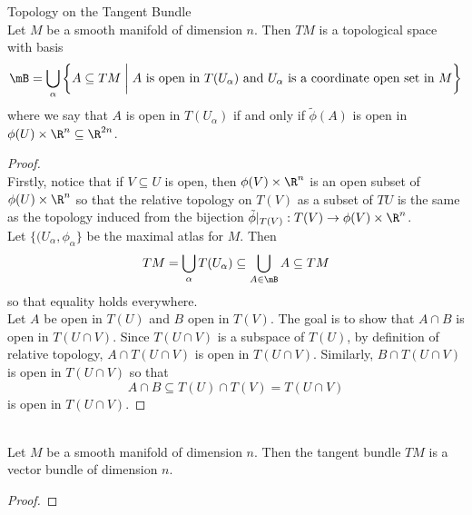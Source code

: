 \documentclass[a4paper]{article}
\begin{document}
\begin{thm}{Topology on the Tangent Bundle}{}\\
Let $M$ be a smooth manifold of dimension $n$. Then $TM$ is a topological space with basis $$\mB=\bigcup_{\alpha}\left\{A\subseteq TM\;\bigg{|}\;A\text{ is open in } T(U_\alpha)\text{ and } U_\alpha\text{ is a coordinate open set in }M\right\}$$ where we say that $A$ is open in $T(U_\alpha)$ if and only if $\tilde{\phi}(A)$ is open in $\phi(U)\times\R^n\subseteq\R^{2n}$. 
\begin{proof}\\
Firstly, notice that if $V\subseteq U$ is open, then $\phi(V)\times\R^n$ is an open subset of $\phi(U)\times\R^n$ so that the relative topology on $T(V)$ as a subset of $TU$ is the same as the topology induced from the bijection $\tilde{\phi}|_{T(V)}:T(V)\to\phi(V)\times\R^n$. \\

Let $\{(U_\alpha,\phi_\alpha\}$ be the maximal atlas for $M$. Then $$TM=\bigcup_{\alpha}T(U_\alpha)\subseteq\bigcup_{A\in\mB}A\subseteq TM$$ so that equality holds everywhere. \\

Let $A$ be open in $T(U)$ and $B$ open in $T(V)$. The goal is to show that $A\cap B$ is open in $T(U\cap V)$. Since $T(U\cap V)$ is a subspace of $T(U)$, by definition of relative topology, $A\cap T(U\cap V)$ is open in $T(U\cap V)$. Similarly, $B\cap T(U\cap V)$ is open in $T(U\cap V)$ so that $$A\cap B\subseteq T(U)\cap T(V)=T(U\cap V)$$ is open in $T(U\cap V)$. 
\end{proof}
\end{thm}

\begin{prp}{}{}\\
Let $M$ be a smooth manifold of dimension $n$. Then the tangent bundle $TM$ is a vector bundle of dimension $n$. 
\begin{proof}

\end{proof}
\end{prp}
\end{document}
